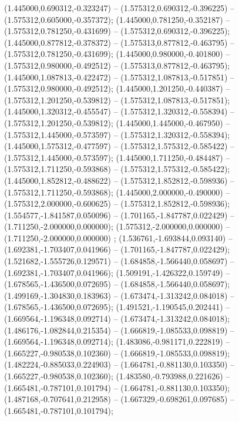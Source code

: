  (1.445000,0.690312,-0.323247) -- (1.575312,0.690312,-0.396225) -- (1.575312,0.605000,-0.357372);
 (1.445000,0.781250,-0.352187) -- (1.575312,0.781250,-0.431699) -- (1.575312,0.690312,-0.396225);
 (1.445000,0.877812,-0.378372) -- (1.575313,0.877812,-0.463795) -- (1.575312,0.781250,-0.431699);
 (1.445000,0.980000,-0.401800) -- (1.575312,0.980000,-0.492512) -- (1.575313,0.877812,-0.463795);
 (1.445000,1.087813,-0.422472) -- (1.575312,1.087813,-0.517851) -- (1.575312,0.980000,-0.492512);
 (1.445000,1.201250,-0.440387) -- (1.575312,1.201250,-0.539812) -- (1.575312,1.087813,-0.517851);
 (1.445000,1.320312,-0.455547) -- (1.575312,1.320312,-0.558394) -- (1.575312,1.201250,-0.539812);
 (1.445000,1.445000,-0.467950) -- (1.575312,1.445000,-0.573597) -- (1.575312,1.320312,-0.558394);
 (1.445000,1.575312,-0.477597) -- (1.575312,1.575312,-0.585422) -- (1.575312,1.445000,-0.573597);
 (1.445000,1.711250,-0.484487) -- (1.575312,1.711250,-0.593868) -- (1.575312,1.575312,-0.585422);
 (1.445000,1.852812,-0.488622) -- (1.575312,1.852812,-0.598936) -- (1.575312,1.711250,-0.593868);
 (1.445000,2.000000,-0.490000) -- (1.575312,2.000000,-0.600625) -- (1.575312,1.852812,-0.598936);
 (1.554577,-1.841587,0.050096) -- (1.701165,-1.847787,0.022429) -- (1.711250,-2.000000,0.000000);
 (1.575312,-2.000000,0.000000) -- (1.711250,-2.000000,0.000000) ;
 (1.536761,-1.693844,0.093140) -- (1.692381,-1.703407,0.041966) -- (1.701165,-1.847787,0.022429);
 (1.521682,-1.555726,0.129571) -- (1.684858,-1.566440,0.058697) -- (1.692381,-1.703407,0.041966);
 (1.509191,-1.426322,0.159749) -- (1.678565,-1.436500,0.072695) -- (1.684858,-1.566440,0.058697);
 (1.499169,-1.304830,0.183963) -- (1.673474,-1.313242,0.084018) -- (1.678565,-1.436500,0.072695);
 (1.491521,-1.190545,0.202441) -- (1.669564,-1.196348,0.092714) -- (1.673474,-1.313242,0.084018);
 (1.486176,-1.082844,0.215354) -- (1.666819,-1.085533,0.098819) -- (1.669564,-1.196348,0.092714);
 (1.483086,-0.981171,0.222819) -- (1.665227,-0.980538,0.102360) -- (1.666819,-1.085533,0.098819);
 (1.482224,-0.885033,0.224903) -- (1.664781,-0.881130,0.103350) -- (1.665227,-0.980538,0.102360);
 (1.483580,-0.793988,0.221626) -- (1.665481,-0.787101,0.101794) -- (1.664781,-0.881130,0.103350);
 (1.487168,-0.707641,0.212958) -- (1.667329,-0.698261,0.097685) -- (1.665481,-0.787101,0.101794);
